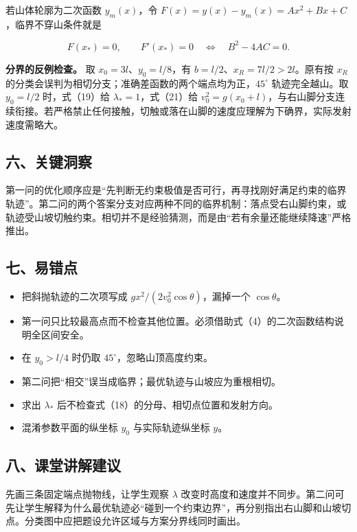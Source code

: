 \documentclass[12pt,a4paper,UTF8]{ctexart}
\newcommand{\tightlist}{\setlength{\itemsep}{0pt}\setlength{\parskip}{0pt}}
\begin{document}
若山体轮廓为二次函数 \(y_m(x)\)，令
\(F(x)=y(x)-y_m(x)=Ax^2+Bx+C\)，临界不穿山条件就是

\[F(x_*)=0,\qquad F'(x_*)=0
\quad\Longleftrightarrow\quad B^2-4AC=0.\]

\textbf{分界的反例检查。} 取 \(x_0=3l\)、\(y_0=l/8\)，有
\(b=l/2\)、\(x_R=7l/2>2l\)。原有按 \(x_R\)
的分类会误判为相切分支；准确差函数的两个端点均为正，\(45^\circ\)
轨迹完全越山。取 \(y_0=l/2\) 时，式（19）给 \(\lambda_*=1\)，式（21）给
\(v_0^2=g(x_0+l)\)，与右山脚分支连续衔接。若严格禁止任何接触，切触或落在山脚的速度应理解为下确界，实际发射速度需略大。

\subsection{六、关键洞察}\label{ux516dux5173ux952eux6d1eux5bdf-1}

第一问的优化顺序应是``先判断无约束极值是否可行，再寻找刚好满足约束的临界轨迹''。第二问的两个答案分支对应两种不同的临界机制：落点受右山脚约束，或轨迹受山坡切触约束。相切并不是经验猜测，而是由``若有余量还能继续降速''严格推出。

\subsection{七、易错点}\label{ux4e03ux6613ux9519ux70b9-1}

\begin{itemize}
\tightlist
\item
  把斜抛轨迹的二次项写成 \(gx^2/(2v_0^2\cos\theta)\)，漏掉一个
  \(\cos\theta\)。
\item
  第一问只比较最高点而不检查其他位置。必须借助式（4）的二次函数结构说明全区间安全。
\item
  在 \(y_0>l/4\) 时仍取 \(45^\circ\)，忽略山顶高度约束。
\item
  第二问把``相交''误当成临界；最优轨迹与山坡应为重根相切。
\item
  求出 \(\lambda_*\) 后不检查式（18）的分母、相切点位置和发射方向。
\item
  混淆参数平面的纵坐标 \(y_0\) 与实际轨迹纵坐标 \(y\)。
\end{itemize}

\subsection{八、课堂讲解建议}\label{ux516bux8bfeux5802ux8bb2ux89e3ux5efaux8bae-1}

先画三条固定端点抛物线，让学生观察 \(\lambda\)
改变时高度和速度并不同步。第二问可先让学生解释为什么最优轨迹必``碰到一个约束边界''，再分别指出右山脚和山坡切点。分类图中应把题设允许区域与方案分界线同时画出。
\end{document}
